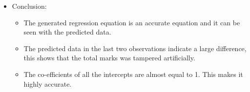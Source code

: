 \begin{itemize}
\begin{center}
\begin{tabular}{ | c | c | c |}
			\end{tabular}
		\end{center}
	
	\item
	Conclusion:\\	
	\begin{itemize}
		\item
		The generated regression equation is an accurate equation and it can be seen with the predicted data.
		\item
		The predicted data in the last two observations indicate a large difference, this shows that the total marks was tampered artificially.
		\item
		The co-efficients of all the intercepts are almost equal to 1. This makes it highly accurate.		
	\end{itemize}
\end{itemize}